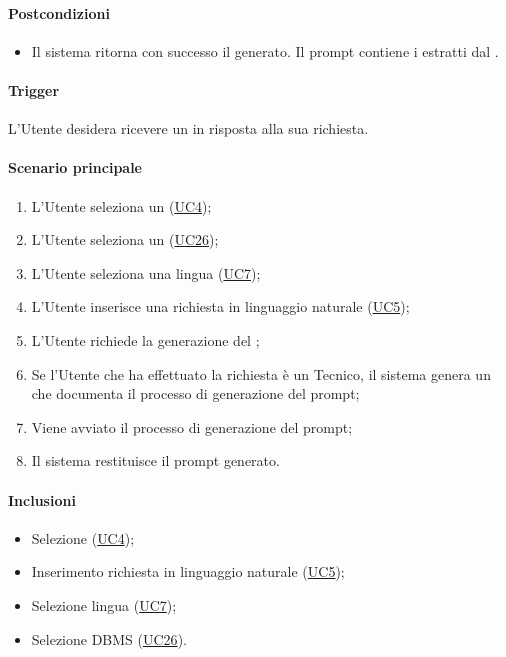 \paragraph*{Postcondizioni}
\begin{itemize}
  \item Il sistema ritorna con successo il  generato. Il prompt contiene i  estratti dal .
\end{itemize}

\paragraph*{Trigger}
L'Utente desidera ricevere un  in risposta alla sua richiesta.

\paragraph*{Scenario principale}
\begin{enumerate}
  \item L'Utente seleziona un (\hyperref[UC4]{UC4});
  \item L'Utente seleziona un  (\hyperref[UC26]{UC26});
  \item L'Utente seleziona una lingua (\hyperref[UC7]{UC7});
  \item L'Utente inserisce una richiesta in linguaggio naturale (\hyperref[UC5]{UC5});
  \item L'Utente richiede la generazione del ;
  \item Se l'Utente che ha effettuato la richiesta è un Tecnico, il sistema genera un  che documenta il processo di generazione del prompt;
  \item Viene avviato il processo di generazione del prompt;
  \item Il sistema restituisce il prompt generato.
\end{enumerate}

\paragraph*{Inclusioni}
\begin{itemize}
  \item Selezione  (\hyperref[UC4]{UC4});
  \item Inserimento richiesta in linguaggio naturale (\hyperref[UC5]{UC5});
  \item Selezione lingua (\hyperref[UC7]{UC7});
  \item Selezione DBMS (\hyperref[UC26]{UC26}).
\end{itemize}

